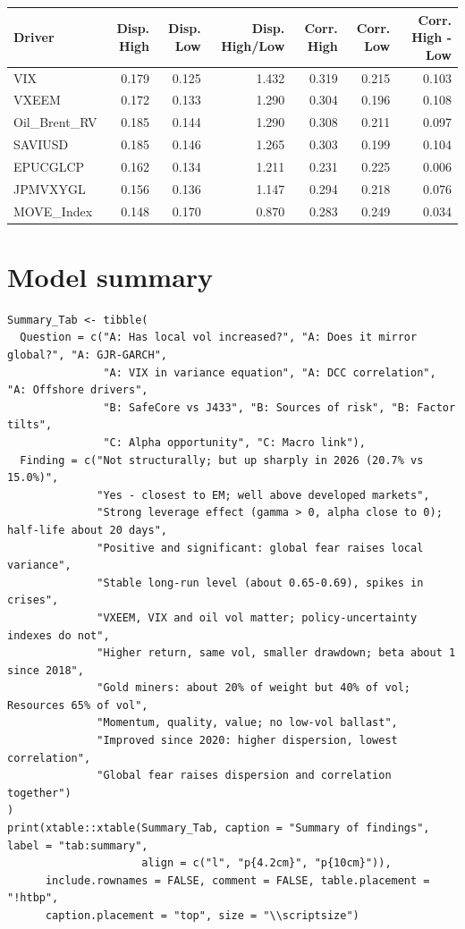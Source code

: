\documentclass[11pt,preprint]{elsarticle}
\let\origtable\table
\let\endorigtable\endtable
\renewenvironment{table}[1][2] {
    \expandafter\origtable\expandafter[H]
} {
    \endorigtable
}
\numberwithin{equation}{section}
\numberwithin{figure}{section}
\numberwithin{table}{section}
\begin{document}
\begin{table}[!htbp]
\centering
\caption{Dispersion and correlation when each driver is in its top versus bottom quintile (since 2020)} 
\label{tab:macrostrat}
\begingroup\scriptsize
\begin{tabular}{lrrrrrr}
  \hline
Driver & Disp. High & Disp. Low & Disp. High/Low & Corr. High & Corr. Low & Corr. High - Low \\ 
  \hline
VIX & 0.179 & 0.125 & 1.432 & 0.319 & 0.215 & 0.103 \\ 
  VXEEM & 0.172 & 0.133 & 1.290 & 0.304 & 0.196 & 0.108 \\ 
  Oil\_Brent\_RV & 0.185 & 0.144 & 1.290 & 0.308 & 0.211 & 0.097 \\ 
  SAVIUSD & 0.185 & 0.146 & 1.265 & 0.303 & 0.199 & 0.104 \\ 
  EPUCGLCP & 0.162 & 0.134 & 1.211 & 0.231 & 0.225 & 0.006 \\ 
  JPMVXYGL & 0.156 & 0.136 & 1.147 & 0.294 & 0.218 & 0.076 \\ 
  MOVE\_Index & 0.148 & 0.170 & 0.870 & 0.283 & 0.249 & 0.034 \\ 
   \hline
\end{tabular}
\endgroup
\end{table}

\section{\texorpdfstring{Model summary
\label{Summary}}{Model summary }}\label{model-summary}

\begin{verbatim}
Summary_Tab <- tibble(
  Question = c("A: Has local vol increased?", "A: Does it mirror global?", "A: GJR-GARCH",
               "A: VIX in variance equation", "A: DCC correlation", "A: Offshore drivers",
               "B: SafeCore vs J433", "B: Sources of risk", "B: Factor tilts",
               "C: Alpha opportunity", "C: Macro link"),
  Finding = c("Not structurally; but up sharply in 2026 (20.7% vs 15.0%)",
              "Yes - closest to EM; well above developed markets",
              "Strong leverage effect (gamma > 0, alpha close to 0); half-life about 20 days",
              "Positive and significant: global fear raises local variance",
              "Stable long-run level (about 0.65-0.69), spikes in crises",
              "VXEEM, VIX and oil vol matter; policy-uncertainty indexes do not",
              "Higher return, same vol, smaller drawdown; beta about 1 since 2018",
              "Gold miners: about 20% of weight but 40% of vol; Resources 65% of vol",
              "Momentum, quality, value; no low-vol ballast",
              "Improved since 2020: higher dispersion, lowest correlation",
              "Global fear raises dispersion and correlation together")
)
print(xtable::xtable(Summary_Tab, caption = "Summary of findings", label = "tab:summary",
                     align = c("l", "p{4.2cm}", "p{10cm}")),
      include.rownames = FALSE, comment = FALSE, table.placement = "!htbp",
      caption.placement = "top", size = "\\scriptsize")
\end{verbatim}
\end{document}
